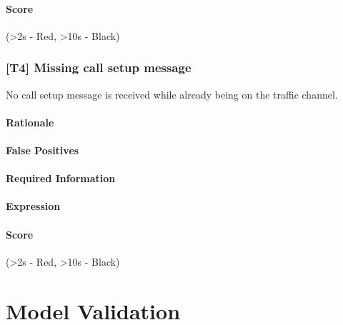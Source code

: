 \documentclass[a4paper,11pt,notitlepage,bigheadings,oneside]{scrartcl}
\begin{document}
\TBD{}

\paragraph{Score}

\TBD{} (\textgreater 2s - Red, \textgreater 10s - Black)


\subsubsection{[T4] Missing call setup message}

No call setup message is received while already being on the traffic channel.

\paragraph{Rationale}

\TBD{}

\paragraph{False Positives}

\TBD{}

\paragraph{Required Information}

\TBD{}

\paragraph{Expression}

\TBD{}

\paragraph{Score}

\TBD{} (\textgreater 2s - Red, \textgreater 10s - Black)



\TBD{}


\section{Model Validation}



\end{document}
